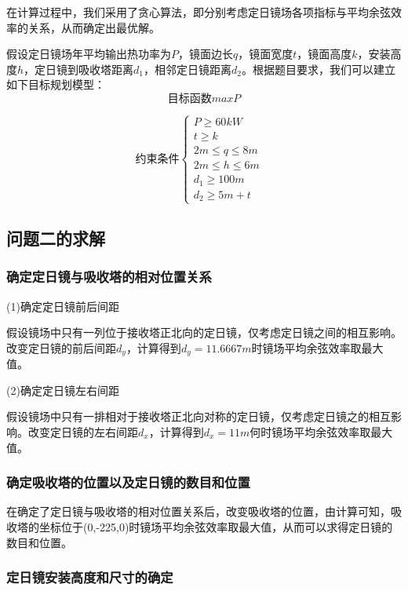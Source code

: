 \documentclass[withoutpreface,bwprint]{cumcmthesis}
\begin{document}
        在计算过程中，我们采用了贪心算法，即分别考虑定日镜场各项指标与平均余弦效率的关系，从而确定出最优解。
        
        假设定日镜场年平均输出热功率为$P$，镜面边长$q$，镜面宽度$t$，镜面高度$k$，安装高度$h$，定日镜到吸收塔距离$d_1$，相邻定日镜距离$d_2$。根据题目要求，我们可以建立如下目标规划模型：
        \begin{equation}
        \text{目标函数}
        maxP
        \end{equation}
        
		\begin{equation}
		\text{约束条件}
		\begin{cases}
		P\ge60kW &\\
		t\ge k &\\
		2m\le q\le 8m&\\
		2m\le h\le 6m&\\
		d_1\ge 100m&\\
		d_2\ge 5m+t&
		\end{cases}
		\end{equation}
		
		\subsection{问题二的求解}
		\subsubsection{确定定日镜与吸收塔的相对位置关系}
			(1)确定定日镜前后间距
			
			假设镜场中只有一列位于接收塔正北向的定日镜，仅考虑定日镜之间的相互影响。改变定日镜的前后间距$d_y$，计算得到$d_y=11.6667m$时镜场平均余弦效率取最大值。
			
			(2)确定定日镜左右间距
			
			假设镜场中只有一排相对于接收塔正北向对称的定日镜，仅考虑定日镜之的相互影响。改变定日镜的左右间距$d_x$，计算得到$d_x=11m$何时镜场平均余弦效率取最大值。
			
		\subsubsection{确定吸收塔的位置以及定日镜的数目和位置}
			
			在确定了定日镜与吸收塔的相对位置关系后，改变吸收塔的位置，由计算可知，吸收塔的坐标位于(0,-225,0)时镜场平均余弦效率取最大值，从而可以求得定日镜的数目和位置。
			
		\subsubsection{定日镜安装高度和尺寸的确定}
			
\end{document}
